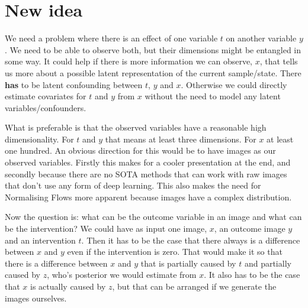 \documentclass{article}
\begin{document}



\section{New idea}
We need a problem where there is an effect of one variable $t$ on another variable $y$. We need to be able to observe both, but their dimensions might be entangled in some way. It could help if there is more information we can observe, $x$, that tells us more about a possible latent representation of the current sample/state. There \textbf{has} to be latent confounding between $t$, $y$ and $x$. Otherwise we could directly estimate covariates for $t$ and $y$ from $x$ without the need to model any latent variables/confounders. 

What is preferable is that the observed variables have a reasonable high dimensionality. For $t$ and $y$ that means at least three dimensions. For $x$ at least one hundred. An obvious direction for this would be to have images as our observed variables. Firstly this makes for a cooler presentation at the end, and secondly because there are no SOTA methods that can work with raw images that don't use any form of deep learning. This also makes the need for Normalising Flows more apparent because images have a complex distribution.

Now the question is: what can be the outcome variable in an image and what can be the intervention? We could have as input one image, $x$, an outcome image $y$ and an intervention $t$. Then it has to be the case that there always is a difference between $x$ and $y$ even if the intervention is zero. That would make it so that there is a difference between $x$ and $y$ that is partially caused by $t$ and partially caused by $z$, who's posterior we would estimate from $x$. It also has to be the case that $x$ is actually caused by $z$, but that can be arranged if we generate the images ourselves. 
\end{document}
